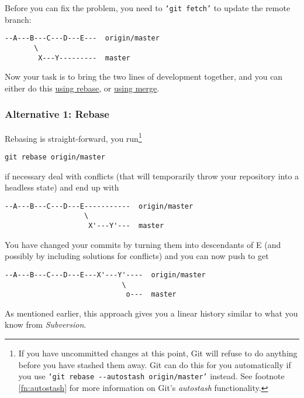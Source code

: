 \documentclass[12pt,pdftex]{article}
\begin{document}
Before you can fix the problem, you need to \texttt{‘git fetch’} to update the
remote branch:
\begin{verbatim}
--A---B---C---D---E---  origin/master
       \
        X---Y---------  master
\end{verbatim}

Now your task is to bring the two lines of development together, and
you can either do this \hyperref[Rebase]{using rebase}, or \hyperref[Merge]{using merge}.


\subsubsection{Alternative 1: Rebase}
\label{sec-5-1-1}

Rebasing is straight-forward, you run\footnote{If you have uncommitted changes at this point, Git will refuse to
do anything before you have stashed them away.
Git can do this for you automatically if you use
\texttt{‘git rebase -{}-autostash origin/master’} instead.
See footnote \ref{fn:autostash} for more information on Git's
\emph{autostash} functionality.}
\lstset{frame=single,basicstyle=\ttfamily\footnotesize,language=sh,label= ,caption= ,captionpos=b,numbers=none}
\begin{lstlisting}
git rebase origin/master
\end{lstlisting}
if necessary deal with conflicts (that will temporarily throw your
repository into a headless state) and end up with
\begin{verbatim}
--A---B---C---D---E-----------  origin/master
                   \
                    X'---Y'---  master
\end{verbatim}
You have changed your commits by turning them into descendants of E (and
possibly by including solutions for conflicts) and you can now push to
get
\begin{verbatim}
--A---B---C---D---E---X'---Y'----  origin/master
                            \
                             o---  master
\end{verbatim}
As mentioned earlier, this approach gives you a linear history similar
to what you know from \emph{Subversion}.

\bigskip
\end{document}
